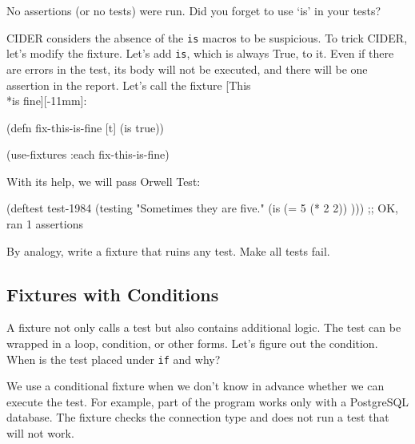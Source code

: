 \begin{english}
  \begin{clojure}
No assertions (or no tests) were run.
Did you forget to use ‘is’ in your tests?
  \end{clojure}
\end{english}


CIDER considers the absence of the \verb|is| macros to be suspicious. To trick CIDER, let's modify the fixture. Let's add \verb|is|, which is always True, to it. Even if there are errors in the test, its body will not be executed, and there will be one assertion in the report. Let's call the fixture [This\\*is fine][-11mm]:

\begin{english}
  \begin{clojure}
(defn fix-this-is-fine [t]
  (is true))

(use-fixtures :each fix-this-is-fine)
  \end{clojure}
\end{english}


With its help, we will pass Orwell Test:

\begin{english}
  \begin{clojure}
(deftest test-1984
  (testing "Sometimes they are five."
    (is (= 5 (* 2 2)) )))
;; OK, ran 1 assertions
  \end{clojure}
\end{english}

By analogy, write a fixture that ruins any test. Make all tests fail.

\subsection{Fixtures with Conditions}


A fixture not only calls a test but also contains additional logic. The test can be wrapped in a loop, condition, or other forms. Let's figure out the condition. When is the test placed under \verb|if| and why?

We use a conditional fixture when we don't know in advance whether we can execute the test. For example, part of the program works only with a PostgreSQL database. The fixture checks the connection type and does not run a test that will not work.

